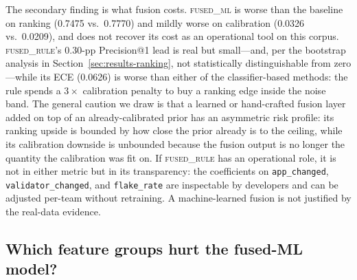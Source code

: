 \documentclass[preprint,12pt]{elsarticle}
\begin{document}
The secondary finding is what fusion costs. \textsc{fused\_ml} is worse than the baseline on ranking (0.7475 vs.\ 0.7770) and mildly worse on calibration (0.0326 vs.\ 0.0209), and does not recover its cost as an operational tool on this corpus. \textsc{fused\_rule}'s 0.30-pp Precision@1 lead is real but small---and, per the bootstrap analysis in Section~\ref{sec:results-ranking}, not statistically distinguishable from zero---while its ECE (0.0626) is worse than either of the classifier-based methods: the rule spends a $3\times$ calibration penalty to buy a ranking edge inside the noise band. The general caution we draw is that a learned or hand-crafted fusion layer added on top of an already-calibrated prior has an asymmetric risk profile: its ranking upside is bounded by how close the prior already is to the ceiling, while its calibration downside is unbounded because the fusion output is no longer the quantity the calibration was fit on. If \textsc{fused\_rule} has an operational role, it is not in either metric but in its transparency: the coefficients on \texttt{app\_changed}, \texttt{validator\_changed}, and \texttt{flake\_rate} are inspectable by developers and can be adjusted per-team without retraining. A machine-learned fusion is not justified by the real-data evidence.

\subsection{Which feature groups hurt the fused-ML model?}
\label{sec:discussion-ablation}
\end{document}
